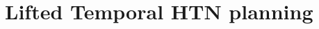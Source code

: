 \documentclass[letterpaper]{article} %
\begin{document}





\section{Lifted Temporal HTN planning}

\end{document}
